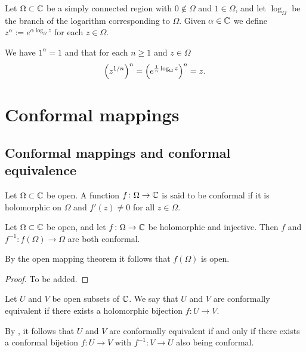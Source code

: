 \documentclass[11pt,a4paper]{article}
\begin{document}
\begin{definition}
  Let $\Omega \subset \mathbb{C}$ be a simply connected region with $0 \notin \Omega$
  and $1 \in \Omega$,
  and let $\log_{\Omega}$ be the branch of the logarithm corresponding to
  $\Omega$.
  Given $\alpha \in \mathbb{C}$ we define $z^{\alpha} := e^{\alpha \log_{\Omega} z}$
  for each $z \in \Omega$.
\end{definition}

\begin{remark}
  We have $1^{\alpha} = 1$ and that for each $n \geq 1$ and $z \in \Omega$
  \[
    \del{z^{1/n}}^n = \del{e^{\frac{1}{n} \log_{\Omega} z}}^n = z.
  \]
\end{remark}

\newpage

\section{Conformal mappings}
\subsection{Conformal mappings and conformal equivalence}
\begin{definition}
  Let $\Omega \subset \mathbb{C}$ be open.
  A function $f \colon \Omega \to \mathbb{C}$ is said to be conformal if it is
  holomorphic on $\Omega$ and $f'(z) \neq 0$ for all $z \in \Omega$.
\end{definition}

\begin{theorem}
  \label{thm:holomorphic-injective-implies-conformal}
  Let $\Omega \subset \mathbb{C}$ be open,
  and let $f \colon \Omega \to \mathbb{C}$ be holomorphic and injective.
  Then $f$ and $f^{-1} \colon f(\Omega) \to \Omega$ are both conformal.
\end{theorem}
\begin{remark}
  By the open mapping theorem it follows that $f(\Omega)$ is open.
\end{remark}
\begin{proof}
  To be added.
\end{proof}

\begin{definition}
  Let $U$ and $V$ be open subsets of $\mathbb{C}$.
  We say that $U$ and $V$ are conformally equivalent if there exists a
  holomorphic bijection $f \colon U \to V$.
\end{definition}

\begin{remark}
  By , it follows that $U$ and $V$
  are conformally equivalent if and only if there exists a conformal
  bijetion $f \colon U \to V$ with $f^{-1} \colon V \to U$ also being
  conformal.
\end{remark}
\end{document}
